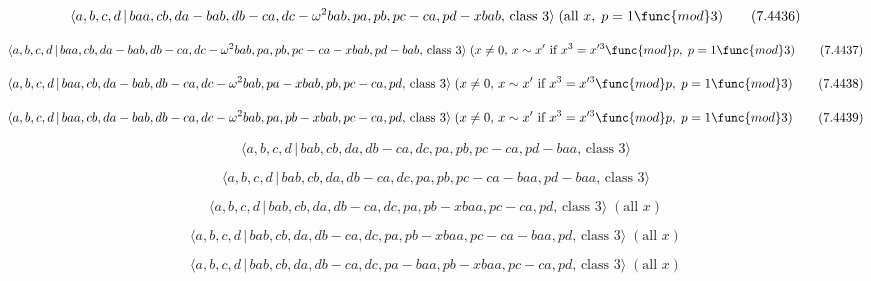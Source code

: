 \documentclass[10pt]{article}
\begin{document}
\begin{equation}
\langle a,b,c,d\,|\,baa,cb,da-bab,db-ca,dc-\omega
^{2}bab,pa,pb,pc-ca,pd-xbab,\,\text{class }3\rangle \;(\text{all }x,\;p=1%
\func{mod}3)  \tag{7.4436}
\end{equation}

\begin{equation}
\langle a,b,c,d\,|\,baa,cb,da-bab,db-ca,dc-\omega
^{2}bab,pa,pb,pc-ca-xbab,pd-bab,\,\text{class }3\rangle \;(x\neq 0,\,x\sim
x^{\prime }\text{ if }x^{3}=x^{\prime 3}\func{mod}p,\;p=1\func{mod}3) 
\tag{7.4437}
\end{equation}

\begin{equation}
\langle a,b,c,d\,|\,baa,cb,da-bab,db-ca,dc-\omega
^{2}bab,pa-xbab,pb,pc-ca,pd,\,\text{class }3\rangle \;(x\neq 0,\,x\sim
x^{\prime }\text{ if }x^{3}=x^{\prime 3}\func{mod}p,\;p=1\func{mod}3) 
\tag{7.4438}
\end{equation}

\begin{equation}
\langle a,b,c,d\,|\,baa,cb,da-bab,db-ca,dc-\omega
^{2}bab,pa,pb-xbab,pc-ca,pd,\,\text{class }3\rangle \;(x\neq 0,\,x\sim
x^{\prime }\text{ if }x^{3}=x^{\prime 3}\func{mod}p,\;p=1\func{mod}3) 
\tag{7.4439}
\end{equation}

\begin{equation}
\langle a,b,c,d\,|\,bab,cb,da,db-ca,dc,pa,pb,pc-ca,pd-baa,\,\text{class }%
3\rangle  \tag{7.4440}
\end{equation}

\begin{equation}
\langle a,b,c,d\,|\,bab,cb,da,db-ca,dc,pa,pb,pc-ca-baa,pd-baa,\,\text{class }%
3\rangle  \tag{7.4441}
\end{equation}

\begin{equation}
\langle a,b,c,d\,|\,bab,cb,da,db-ca,dc,pa,pb-xbaa,pc-ca,pd,\,\text{class }%
3\rangle \;(\text{all }x)  \tag{7.4442}
\end{equation}

\begin{equation}
\langle a,b,c,d\,|\,bab,cb,da,db-ca,dc,pa,pb-xbaa,pc-ca-baa,pd,\,\text{class 
}3\rangle \;(\text{all }x)  \tag{7.4443}
\end{equation}

\begin{equation}
\langle a,b,c,d\,|\,bab,cb,da,db-ca,dc,pa-baa,pb-xbaa,pc-ca,pd,\,\text{class 
}3\rangle \;(\text{all }x)  \tag{7.4444}
\end{equation}
\end{document}
